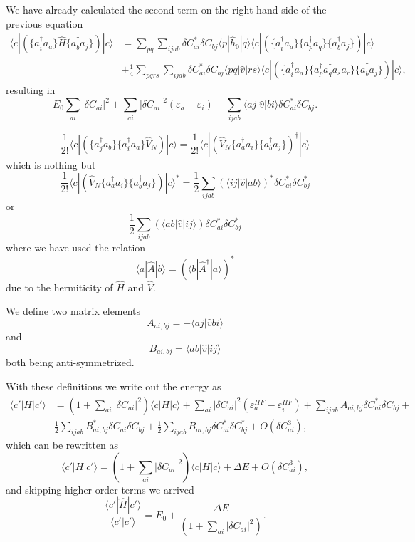 \documentclass[%
oneside,                 %
final,                   %
10pt]{article}
\begin{document}
We have already calculated the second term on the right-hand side of the previous equation
\begin{align}
\langle c | \left(\{a^\dagger_i a_a\} \hat{H} \{a^\dagger_b a_j\} \right) | c\rangle&=\sum_{pq} \sum_{ijab}\delta C_{ai}^*\delta C_{bj} \langle p|\hat{h}_0 |q\rangle 
            \langle c | \left(\{a^{\dagger}_i a_a\}\{a^{\dagger}_pa_q\} 
             \{a^{\dagger}_b a_j\} \right)| c\rangle\\
& +\frac{1}{4} \sum_{pqrs} \sum_{ijab}\delta C_{ai}^*\delta C_{bj} \langle pq| \hat{v}|rs\rangle 
            \langle c | \left(\{a^\dagger_i a_a\}\{a^{\dagger}_p a^{\dagger}_q a_s  a_r\} \{a^{\dagger}_b a_j\} \right)| c\rangle ,
\end{align}
resulting in
\[
E_0\sum_{ai}|\delta C_{ai}|^2+\sum_{ai}|\delta C_{ai}|^2(\varepsilon_a-\varepsilon_i)-\sum_{ijab} \langle aj|\hat{v}| bi\rangle \delta C_{ai}^*\delta C_{bj}.
\]

\[
\frac{1}{2!}\langle c |\left(\{a^\dagger_j a_b\} \{a^\dagger_i a_a\} \hat{V}_N  \right) | c\rangle  = 
\frac{1}{2!}\langle c |\left( \hat{V}_N \{a^\dagger_a a_i\} \{a^\dagger_b a_j\} \right)^{\dagger} | c\rangle 
\]
which is nothing but
\[
\frac{1}{2!}\langle c |  \left( \hat{V}_N \{a^\dagger_a a_i\} \{a^\dagger_b a_j\} \right) | c\rangle^*
=\frac{1}{2} \sum_{ijab} (\langle ij|\hat{v}|ab\rangle)^*\delta C_{ai}^*\delta C_{bj}^*
\]
or 
\[
\frac{1}{2} \sum_{ijab} (\langle ab|\hat{v}|ij\rangle)\delta C_{ai}^*\delta C_{bj}^*
\]
where we have used the relation
\[ 
\langle a |\hat{A} | b\rangle =  (\langle b |\hat{A}^{\dagger} | a\rangle)^*
\]
due to the hermiticity of $\hat{H}$ and $\hat{V}$.

We define two matrix elements
\[
A_{ai,bj}=-\langle aj|\hat{v} bi\rangle
\]
and
\[
B_{ai,bj}=\langle ab|\hat{v}|ij\rangle
\]
both being anti-symmetrized.

With these definitions we write out the energy as
\begin{align}
\langle c'|H|c'\rangle& = \left(1+\sum_{ai}|\delta C_{ai}|^2\right)\langle c |H|c\rangle+\sum_{ai}|\delta C_{ai}|^2(\varepsilon_a^{HF}-\varepsilon_i^{HF})+\sum_{ijab}A_{ai,bj}\delta C_{ai}^*\delta C_{bj}+\\
&\frac{1}{2} \sum_{ijab} B_{ai,bj}^*\delta C_{ai}\delta C_{bj}+\frac{1}{2} \sum_{ijab} B_{ai,bj}\delta C_{ai}^*\delta C_{bj}^*
+O(\delta C_{ai}^3),
\end{align}
which can be rewritten as
\[
\langle c'|H|c'\rangle = \left(1+\sum_{ai}|\delta C_{ai}|^2\right)\langle c |H|c\rangle+\Delta E+O(\delta C_{ai}^3),
\]
and skipping higher-order terms we arrived
\[
\frac{\langle c' |\hat{H} | c'\rangle}{\langle c' |c'\rangle} =E_0+\frac{\Delta E}{\left(1+\sum_{ai}|\delta C_{ai}|^2\right)}.
\]
\end{document}
